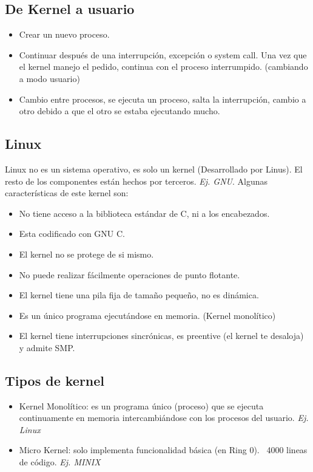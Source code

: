 \documentclass[titlepage,a4paper]{article}
\begin{document}
\subsection*{De Kernel a  usuario}
\begin{itemize}
    \item Crear un nuevo proceso.
    \item Continuar después de una interrupción, excepción o system call. Una vez que el kernel manejo el pedido, continua con el proceso interrumpido. (cambiando a modo usuario)
    \item Cambio entre procesos, se ejecuta un proceso, salta la interrupción, cambio a otro debido a que el otro se estaba ejecutando mucho.
\end{itemize}

\subsection*{Linux}

Linux no es un sistema operativo, es solo un kernel (Desarrollado por Linus). El resto de los componentes están hechos por terceros. \textit{Ej. GNU}. Algunas características de este kernel son:

\begin{itemize}
    \item No tiene acceso a la biblioteca estándar de C, ni a los encabezados.
    \item Esta codificado con GNU C.
    \item El kernel no se protege de si mismo.
    \item No puede realizar fácilmente operaciones de punto flotante.
    \item El kernel tiene una pila fija de tamaño pequeño, no es dinámica.
    \item Es un único programa ejecutándose en memoria. (Kernel monolítico)
    \item El kernel tiene interrupciones sincrónicas, es preentive (el kernel te desaloja) y admite SMP.
\end{itemize}


\subsection*{Tipos de kernel}
\begin{itemize}
    \item Kernel Monolítico: es un programa único (proceso) que se ejecuta continuamente en memoria intercambiándose con los procesos del usuario. \textit{Ej. Linux}
    \item Micro Kernel: solo implementa funcionalidad básica (en Ring 0). ~4000 lineas de código. \textit{Ej. MINIX}
\end{itemize}
\end{document}
